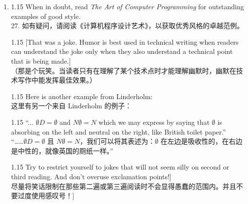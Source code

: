 \documentclass[12pt,a4paper]{article}
\newcommand{\bilingual}[2]{
    \begin{spacing}{1.15} %
        \noindent \normalsize #1 \\[-0.5ex] %
        \small \textcolor{blue!70!black}{#2} %
    \end{spacing}
    \vspace{0.8em} %
}
\begin{document}
\begin{enumerate}
\item \bilingual{When in doubt, read \textit{The Art of Computer Programming} for outstanding examples of good style.}{27. 如有疑问，请阅读《计算机程序设计艺术》，以获取优秀风格的卓越范例。} %
\bilingual{[That was a joke. Humor is best used in technical writing when readers can understand the joke only when they also understand a technical point that is being made.]}{（那是个玩笑。当读者只有在理解了某个技术点时才能理解幽默时，幽默在技术写作中能发挥最佳效果。）} %
\bilingual{Here is another example from Linderholm:}{这里有另一个来自 Linderholm 的例子：} %
\bilingual{``... $\emptyset D=\emptyset$ and $N\emptyset=N$ which we may express by saying that $\emptyset$ is absorbing on the left and neutral on the right, like British toilet paper.''}{“……$\emptyset D=\emptyset$ 且 $N\emptyset=N$，我们可以将其表述为：$\emptyset$ 在左边是吸收性的，在右边是中性的，就像英国的厕纸一样。”} %
\bilingual{Try to restrict yourself to jokes that will not seem silly on second or third reading. And don't overuse exclamation points!]}{尽量将笑话限制在那些第二遍或第三遍阅读时不会显得愚蠢的范围内。并且不要过度使用感叹号！]} %
\end{enumerate}
\end{document}
